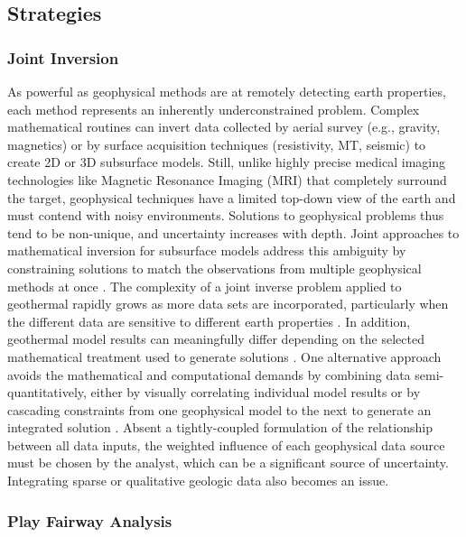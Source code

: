 \subsection{Strategies}
\subsubsection{Joint Inversion}

As powerful as geophysical methods are at remotely detecting earth properties, each method represents an inherently underconstrained problem. Complex mathematical routines can invert data collected by aerial survey (e.g., gravity, magnetics) or by surface acquisition techniques (resistivity, MT, seismic) to create 2D or 3D subsurface models. Still, unlike highly precise medical imaging technologies like Magnetic Resonance Imaging (MRI) that completely surround the target, geophysical techniques have a limited top-down view of the earth and must contend with noisy environments. Solutions to geophysical problems thus tend to be non-unique, and uncertainty increases with depth. Joint approaches to mathematical inversion for subsurface models address this ambiguity by constraining solutions to match the observations from multiple geophysical methods at once \citep{vozoff_joint_1975}. The complexity of a joint inverse problem applied to geothermal rapidly grows as more data sets are incorporated, particularly when the different data are sensitive to different earth properties \citep{moorkamp_framework_2011}. In addition, geothermal model results can meaningfully differ depending on the selected mathematical treatment used to generate solutions \citep{rosenkjaer_comparison_2015}. One alternative approach avoids the mathematical and computational demands by combining data semi-quantitatively, either by visually correlating individual model results or by cascading constraints from one geophysical model to the next to generate an integrated solution \citep{jousset_hengill_2011, lichoro_joint_2019}. Absent a tightly-coupled formulation of the relationship between all data inputs, the weighted influence of each geophysical data source must be chosen by the analyst, which can be a significant source of uncertainty. Integrating sparse or qualitative geologic data also becomes an issue.

\subsubsection{Play Fairway Analysis}

